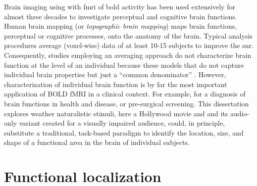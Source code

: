 

%
Brain imaging using with \ac{fmri} of \ac{bold} activity has been used
extensively for almost three decades to investigate perceptual and cognitive
brain functions.
%
Human brain mapping (or \textit{topographic brain mapping}) maps brain functions,
perceptual or cognitive processes, onto the anatomy of the brain.
%
Typical analysis procedures average (voxel-wise) data of at least 10-15
subjects to improve the \ac{snr}.
%
Consequently, studies employing an averaging approach do not characterize brain
function at the level of an individual because these models that do not capture
individual brain properties but just a ``common denominator''
\citep{dubois2016building}. 
%
However, characterization of individual brain function is by far the most
important application of BOLD fMRI in a clinical context.
%
For example, for a diagnosis of brain functions in health and disease, or
pre-surgical screening.
%
This dissertation explores weather naturalistic stimuli, here a Hollywood movie
and and its audio-only variant created for a visually impaired audience, could,
in principle, substitute a traditional, task-based paradigm to identify the
location, size, and shape of a functional area in the brain of individual
subjects.


\section{Functional localization}




